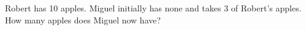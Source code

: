 Robert has 10 apples. Miguel initially has none and takes 3 of Robert's apples. How many apples does Miguel now have?
